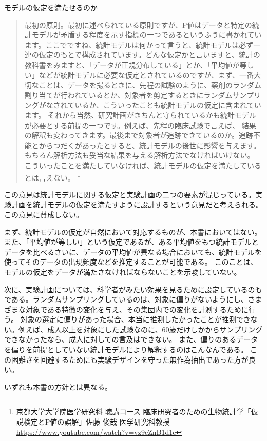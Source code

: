 \begin{SMbox}{モデルの仮定を満たせるのか}
    \ 
    \begin{quote}
    最初の原則。最初に述べられている原則ですが、P値はデータと特定の統計モデルが矛盾する程度を示す指標の一つであるというふうに書かれています。ここでですね、統計モデルは何かって言うと、統計モデルは必ず一連の仮定のもとで構成されています。どんな仮定かと言いますと、統計の教科書をみますと、「データが正規分布している」とか、「平均値が等しい」などが統計モデルに必要な仮定とされているのですが、まず、一番大切なことは、データを撮るときに、先程の試験のように、薬剤のランダム割り当てが行われているとか、対象者を剪定するときにランダムサンプリングがなされているか、こういったことも統計モデルの仮定に含まれています。
    それから当然、研究計画がきちんと守られているかも統計モデルが必要とする前提の一つです。例えば、先程の臨床試験で言えば、
    結果の解釈も変わってきます。最後まで対象者が追跡できているのか。追跡不能とからつだくがあったとすると、統計モデルの後世に影響を与えます。もちろん解析方法も妥当な結果を与える解析方法でなければいけない。
    こういったことを満たしていなければ、統計モデルの仮定を満たしているとは言えない。
    \footnote{京都大学大学院医学研究科 聴講コース 臨床研究者のための生物統計学「仮説検定とP値の誤解」佐藤 俊哉 医学研究科教授 \url{https://www.youtube.com/watch?v=vz9cZnB1d1c} }
    \end{quote}

    この意見は統計モデルに関する仮定と実験計画の二つの要素が混じっている。実験計画を統計モデルの仮定を満たすように設計するという意見だと考えられる。
    この意見に賛成しない。

     まず、統計モデルの仮定が自然において対応するものが、本書においてはない。また、「平均値が等しい」という仮定であるが、ある平均値をもつ統計モデルとデータを比べるさいに、データの平均値が異なる場合においても、統計モデルを使ってそのデータの出現頻度などを推定することが可能である。
     このことは、モデルの仮定をデータが満たさなければならないことを示唆していない。

     次に、実験計画については、科学者がみたい効果を見るために設定しているのもである。ランダムサンプリングしているのは、対象に偏りがないようにし、さまざまな対象である特徴の変化を与え、その集団内での変化を計測するために行う。
     対象の選定に偏りがあった場合、本当に推測したかったことが推測できない。例えば、成人以上を対象にした試験なのに、60歳だけしかからサンプリングできなかったなら、成人に対しての言及はできない。
     また、偏りのあるデータを偏りを前提としていない統計モデルにより解釈するのはこんなんである。
     この困難さを回避するためにも実験デザインを守った無作為抽出であった方が良い。
     
     いずれも本書の方針とは異なる。


\end{SMbox}
